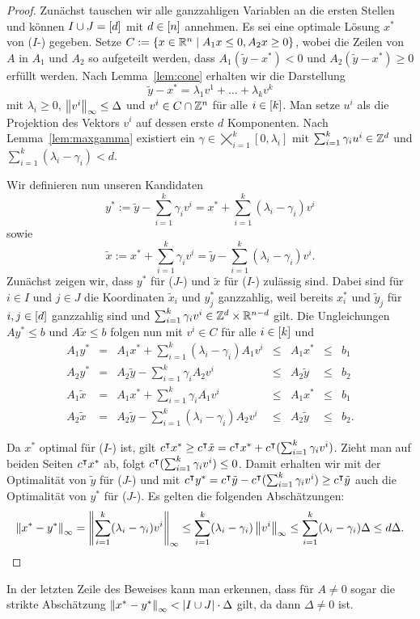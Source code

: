 \begin{proof}
	Zunächst tauschen wir alle ganzzahligen Variablen an die ersten Stellen und können $I\cup J=[d]$ mit $d\in[n]$ annehmen.
	Es sei eine optimale Lösung $x^*$ von ($I$-\MIPR) gegeben.
	Setze $C:=\{ x\in\mathbb{R}^n \mid A_1 x \leq 0, A_2x\geq0 \}$, wobei die Zeilen von $A$ in $A_1$ und $A_2$ so aufgeteilt werden, dass $A_1 (\tilde{y}-x^*)<0$ und $A_2 (\tilde{y}-x^*)\geq0$ erfüllt werden.
	Nach Lemma~\ref{lem:cone} erhalten wir die Darstellung 
	$$\tilde{y}-x^* = \lambda_1v^1 + \dots+\lambda_kv^k$$
	mit $\lambda_i\geq0$, $\left\lVert v^i\right\rVert_\infty\leq \Delta$ und $v^i\in C\cap\mathbb{Z}^n$ für alle $i\in[k]$.
	Man setze $u^i$ als die Projektion des Vektors $v^i$ auf dessen erste $d$ Komponenten.
	Nach Lemma~\ref{lem:maxgamma} existiert ein $\gamma\in\bigtimes_{i=1}^k[0,\lambda_i]$ mit  $\sum_{i=1}^k\gamma_iu^i\in\mathbb{Z}^d$ und $\sum_{i=1}^k(\lambda_i -\gamma_i)<d$.
	
	Wir definieren nun unseren Kandidaten $$y^*:=\tilde{y}-\sum_{i=1}^k\gamma_iv^i=x^*+\sum_{i=1}^k(\lambda_i-\gamma_i)v^i$$
	sowie $$\tilde{x}:=x^*+\sum_{i=1}^k\gamma_iv^i=\tilde{y}-\sum_{i=1}^k(\lambda_i-\gamma_i)v^i.$$
	Zunächst zeigen wir, dass $y^*$ für ($J$-\MIPR) und $\tilde{x}$ für ($I$-\MIPR) zulässig sind.
	Dabei sind für $i\in I$ und $j\in J$ die Koordinaten $\tilde{x}_i$ und $y^*_j$ ganzzahlig, weil bereits $x^*_i$ und $\tilde{y}_j$ für $i,j\in[d]$ ganzzahlig sind und $\sum_{i=1}^k\gamma_iv^i\in\mathbb{Z}^d\times\mathbb{R}^{n-d}$ gilt.
	Die Ungleichungen $Ay^*\leq b$ und $A\tilde{x}\leq b$ folgen nun mit $v^i\in C$ für alle $i\in[k]$ und 
	$$
	\begin{array}{lllllll}
	A_1 y^*&=&A_1x^*+\sum_{i=1}^k(\lambda_i-\gamma_i)A_1v^i &\leq& A_1 x^* &\leq&b_1\\
	A_2 y^*&=&A_2\tilde{y}-\sum_{i=1}^k\gamma_iA_2v^i &\leq& A_2\tilde{y} &\leq& b_2\\
	A_1\tilde{x} &=&A_1x^*+\sum_{i=1}^k \gamma_iA_1v^i &\leq& A_1x^* &\leq&b_1\\
	A_2\tilde{x} &=&A_2\tilde{y}-\sum_{i=1}^k(\lambda_i-\gamma_i)A_2v^i&\leq& A_2\tilde{y}&\leq& b_2.
	\end{array}
	$$
	
	Da $x^*$ optimal für ($I$-\MIPR) ist, gilt $c^\intercal x^*\geq c^\intercal \tilde{x} = c^\intercal x^* + c^\intercal (\sum_{i=1}^k\gamma_iv^i)$.
	Zieht man auf beiden Seiten $c^\intercal x^*$ ab, folgt $c^\intercal(\sum_{i=1}^k\gamma_iv^i)\leq0$.
	Damit erhalten wir mit der Optimalität von $\tilde{y}$ für ($J$-\MIPR) und mit 
	$c^\intercal y^*=c^\intercal\tilde{y}-c^\intercal(\sum_{i=1}^k\gamma_iv^i)\geq c^\intercal\tilde{y}$
	auch die Optimalität von $y^*$ für ($J$-\MIPR).
	Es gelten die folgenden Abschätzungen:
	$$\left\lVert x^*-y^*\right\rVert_\infty=\left\lVert\sum_{i=1}^k(\lambda_i-\gamma_i)v^i\right\rVert_\infty\leq \sum_{i=1}^k(\lambda_i-\gamma_i)\left\lVert v^i\right\rVert_\infty\leq \sum_{i=1}^k(\lambda_i-\gamma_i)\Delta\leq d\Delta.
	$$
\end{proof}
\begin{remark}
	In der letzten Zeile des Beweises kann man erkennen, dass für $A\neq 0$ sogar die strikte Abschätzung $\left\lVert x^*-y^*\right\rVert_\infty<\lvert I\cup J \rvert\cdot\Delta$ gilt, da dann $\Delta\neq 0$ ist.
\end{remark}
